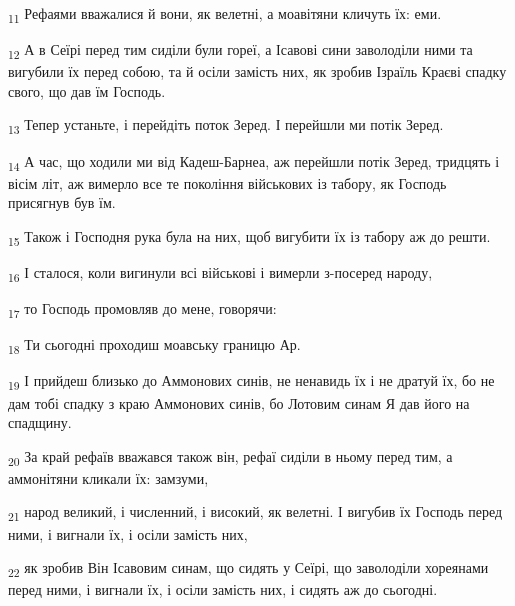 \begin{tcolorbox}
\textsubscript{11} Рефаями вважалися й вони, як велетні, а моавітяни кличуть їх: еми.
\end{tcolorbox}
\begin{tcolorbox}
\textsubscript{12} А в Сеїрі перед тим сиділи були гореї, а Ісавові сини заволоділи ними та вигубили їх перед собою, та й осіли замість них, як зробив Ізраїль Краєві спадку свого, що дав їм Господь.
\end{tcolorbox}
\begin{tcolorbox}
\textsubscript{13} Тепер устаньте, і перейдіть поток Зеред. І перейшли ми потік Зеред.
\end{tcolorbox}
\begin{tcolorbox}
\textsubscript{14} А час, що ходили ми від Кадеш-Барнеа, аж перейшли потік Зеред, тридцять і вісім літ, аж вимерло все те покоління військових із табору, як Господь присягнув був їм.
\end{tcolorbox}
\begin{tcolorbox}
\textsubscript{15} Також і Господня рука була на них, щоб вигубити їх із табору аж до решти.
\end{tcolorbox}
\begin{tcolorbox}
\textsubscript{16} І сталося, коли вигинули всі військові і вимерли з-посеред народу,
\end{tcolorbox}
\begin{tcolorbox}
\textsubscript{17} то Господь промовляв до мене, говорячи:
\end{tcolorbox}
\begin{tcolorbox}
\textsubscript{18} Ти сьогодні проходиш моавську границю Ар.
\end{tcolorbox}
\begin{tcolorbox}
\textsubscript{19} І прийдеш близько до Аммонових синів, не ненавидь їх і не дратуй їх, бо не дам тобі спадку з краю Аммонових синів, бо Лотовим синам Я дав його на спадщину.
\end{tcolorbox}
\begin{tcolorbox}
\textsubscript{20} За край рефаїв вважався також він, рефаї сиділи в ньому перед тим, а аммонітяни кликали їх: замзуми,
\end{tcolorbox}
\begin{tcolorbox}
\textsubscript{21} народ великий, і численний, і високий, як велетні. І вигубив їх Господь перед ними, і вигнали їх, і осіли замість них,
\end{tcolorbox}
\begin{tcolorbox}
\textsubscript{22} як зробив Він Ісавовим синам, що сидять у Сеїрі, що заволоділи хореянами перед ними, і вигнали їх, і осіли замість них, і сидять аж до сьогодні.
\end{tcolorbox}
